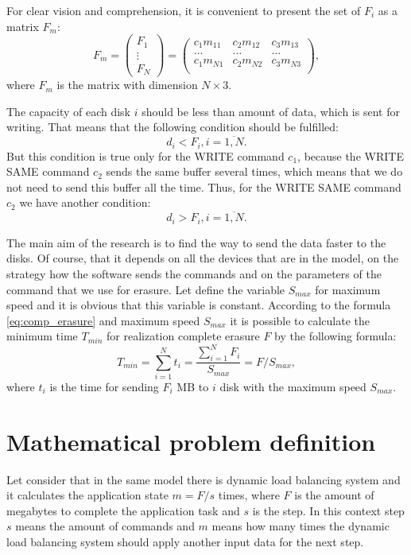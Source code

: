 For clear vision and comprehension, it is convenient to present the set of $F_i$ as a matrix $F_m$:
\begin{equation}
	F_m =
	\begin{pmatrix}
		F_1\\ \vdots\\ F_N 
	\end{pmatrix}
	=
	\begin{pmatrix}
		c_1 m_{11} & c_2 m_{12} & c_3 m_{13} \\
		\ldots & \ldots & \ldots \\
		c_1 m_{N1} & c_2 m_{N2} & c_3 m_{N3} \\
	\end{pmatrix},
\end{equation}
where $F_m$ is the matrix with dimension $N\times3$.

The capacity of each disk $i$ should be less than amount of data, which is sent for writing. That means that the following condition should be fulfilled:
\begin{equation}
	d_i < F_i, i=\overline{1,N}.
\end{equation}
But this condition is true only for the WRITE command $c_1$, because the WRITE SAME command $c_2$ sends the same buffer several times, which means that we do not need to send this buffer all the time. Thus, for the WRITE SAME command $c_2$ we have another condition:
\begin{equation}
	d_i > F_i, i=\overline{1,N}.
\end{equation}

The main aim of the research is to find the way to send the data faster to the disks. Of course, that it depends on all the devices that are in the model, on the strategy how the software sends the commands and on the parameters of the command that we use for erasure. Let define the variable $S_{max}$ for maximum speed and it is obvious that this variable is constant. According to the formula \ref{eq:comp_erasure} and maximum speed $S_{max}$ it is possible to calculate the minimum time $T_{min}$ for realization complete erasure $F$ by the following formula:
\begin{equation}
\label{eq:time_min}
	T_{min} = \sum_{i=1}^{N}t_i 
			= \frac{\sum_{i=1}^{N}F_i}{S_{max}}
			= F/S_{max},
\end{equation}
where $t_i$ is the time for sending $F_i$ MB to $i$ disk with the maximum speed $S_{max}$. 



\section{Mathematical problem definition}
Let consider that in the same model there is dynamic load balancing system and it calculates the application state $m=F/s$ times, where $F$ is the amount of megabytes to complete the application task and $s$ is the step. In this context step $s$ means the amount of commands and $m$ means how many times the dynamic load balancing system should apply another input data for the next step.


